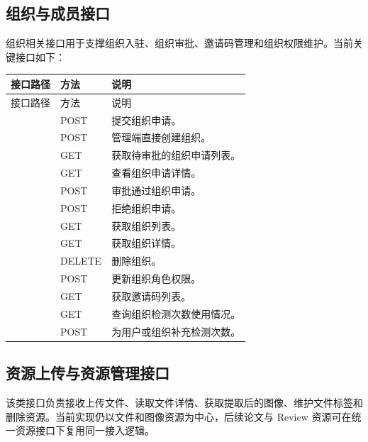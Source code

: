 \subsection{组织与成员接口}
组织相关接口用于支撑组织入驻、组织审批、邀请码管理和组织权限维护。当前关键接口如下：
\begingroup
\small
\setlength{\tabcolsep}{4pt}
\renewcommand{\arraystretch}{1.15}
\begin{longtable}{|L{6.2cm}|L{1.4cm}|L{5.6cm}|}
\hline
接口路径 & 方法 & 说明 \\ \hline
\endfirsthead
\hline
接口路径 & 方法 & 说明 \\ \hline
\endhead
\hline
\endfoot
\hline
\endlastfoot
{} & POST & 提交组织申请。 \\ \hline
{} & POST & 管理端直接创建组织。 \\ \hline
{} & GET & 获取待审批的组织申请列表。 \\ \hline
{} & GET & 查看组织申请详情。 \\ \hline
{} & POST & 审批通过组织申请。 \\ \hline
{} & POST & 拒绝组织申请。 \\ \hline
{} & GET & 获取组织列表。 \\ \hline
{} & GET & 获取组织详情。 \\ \hline
{} & DELETE & 删除组织。 \\ \hline
{} & POST & 更新组织角色权限。 \\ \hline
{} & GET & 获取邀请码列表。 \\ \hline
{} & GET & 查询组织检测次数使用情况。 \\ \hline
{} & POST & 为用户或组织补充检测次数。 \\ \hline
\end{longtable}
\endgroup

\subsection{资源上传与资源管理接口}
该类接口负责接收上传文件、读取文件详情、获取提取后的图像、维护文件标签和删除资源。当前实现仍以文件和图像资源为中心，后续论文与 Review 资源可在统一资源接口下复用同一接入逻辑。

